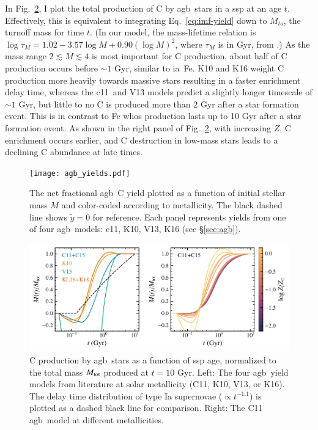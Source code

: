 \documentclass[12pt,oneside,letterpaper]{report}
\newcommand{\agb}{\gls{agb}}
\newcommand{\ia}{\gls{ia}}
\newcommand{\ssp}{\gls{ssp}}
\newcommand{\cxi}{\gls{c11}}
\newcommand{\about}[1]{${\sim} #1$}
\begin{document}
In Fig.~\ref{fig:agb-ssp}, I plot the total production of C by \agb\ stars in a \ssp{} at an age $t$. 
Effectively, this is equivalent to integrating Eq.~\ref{eq:imf-yield} down to $M_{to}$, the turnoff mass for time $t$.
({In our model, the mass-lifetime relation is
$\log \tau_M = 1.02 - 3.57\log M + 0.90 \left(\log M\right)^2$,
where $\tau_M$ is in Gyr,
from \citealt{larson74}.})
As the mass range $2\lesssim M \lesssim 4$ is most important for C production, about half of C production occurs before \about{1} Gyr, similar to \ia\ Fe. 
K10 and K16 weight C production more heavily towards massive stars resulting in a faster enrichment delay time, whereas the \cxi\ and V13 models predict a slightly longer timescale of \about{1} Gyr, but little to no C is produced more than 2 Gyr after a star formation event. This is in contrast to Fe whos production lasts up to 10 Gyr after a star formation event. As shown in the right panel of Fig.~\ref{fig:agb-ssp}, with increasing $Z$, C enrichment occurs earlier, and C destruction in low-mass stars leads to a declining C abundance at late times.
    

\begin{figure}
    \centering
 	    \texttt{[image: agb\_yields.pdf]}
        \caption[Low mass C yields]{The net fractional \agb\ C yield  plotted as a function of initial stellar mass $M$ and color-coded according to metallicity. The black dashed line shows $\tilde{y}=0$ for reference. Each panel represents yields from one of four \agb\ models: \cxi, K10, V13, K16 (see \S \ref{sec:agb}). }
        \label{fig:y_agb}
\end{figure}
\begin{figure}
    \includegraphics[scale=1]{y_agb_t2.pdf}

    \caption[C yields delay time distribution]{
    C production by \agb\ stars as a function of \ssp{} age, normalized to the total mass $M_{\rm tot}$ produced at $t=10$ Gyr. Left: The four \agb\ yield models from literature at solar metallicity (C11, K10, V13, or K16). The delay time distribution of type Ia supernovae ($\propto t^{-1.1}$) is plotted as a dashed black line for comparison. Right: The C11 \agb\ model at different metallicities. }
    \label{fig:agb-ssp}
\end{figure}
\end{document}
